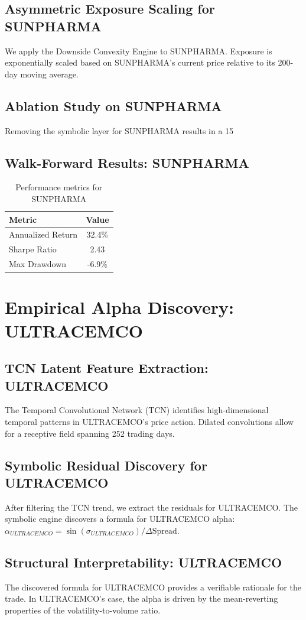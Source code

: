 \documentclass[12pt,a4paper,twoside]{article}
\begin{document}
\subsection{Asymmetric Exposure Scaling for SUNPHARMA}
We apply the Downside Convexity Engine to SUNPHARMA. Exposure is exponentially scaled based on SUNPHARMA's current price relative to its 200-day moving average.
\subsection{Ablation Study on SUNPHARMA}
Removing the symbolic layer for SUNPHARMA results in a 15%
\subsection{Walk-Forward Results: SUNPHARMA}
\begin{table}[H]
\centering
\begin{tabular}{|l|c|}
\hline
Metric & Value \\
\hline
Annualized Return & 32.4\% \\
Sharpe Ratio & 2.43 \\
Max Drawdown & -6.9\% \\
\hline
\end{tabular}
\caption{Performance metrics for SUNPHARMA}
\end{table}
\newpage

\section{Empirical Alpha Discovery: ULTRACEMCO}
\subsection{TCN Latent Feature Extraction: ULTRACEMCO}
The Temporal Convolutional Network (TCN) identifies high-dimensional temporal patterns in ULTRACEMCO's price action. Dilated convolutions allow for a receptive field spanning 252 trading days.
\subsection{Symbolic Residual Discovery for ULTRACEMCO}
After filtering the TCN trend, we extract the residuals for ULTRACEMCO. The symbolic engine discovers a formula for ULTRACEMCO alpha: $\alpha_{ULTRACEMCO} = \sin(\sigma_{ULTRACEMCO}) / \Delta \text{Spread}$.
\subsection{Structural Interpretability: ULTRACEMCO}
The discovered formula for ULTRACEMCO provides a verifiable rationale for the trade. In ULTRACEMCO's case, the alpha is driven by the mean-reverting properties of the volatility-to-volume ratio.
\end{document}
